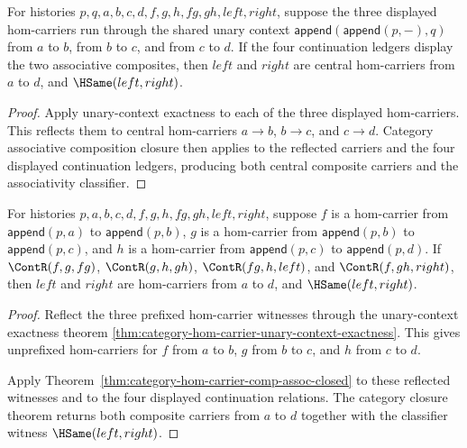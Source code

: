 \begin{theorem}
\label{thm:functor-prefix-hom-carrier-unary-suffix-comp-assoc-reflects}
For histories $p,q,a,b,c,d,f,g,h,fg,gh,left,right$, suppose the three
displayed hom-carriers run through the shared unary context
$\mathsf{append}(\mathsf{append}(p,-),q)$ from $a$ to $b$, from $b$ to $c$,
and from $c$ to $d$. If the four continuation ledgers display the two
associative composites, then $left$ and $right$ are central hom-carriers from
$a$ to $d$, and $\HSame(left,right)$.
\end{theorem}
\begin{proof}
Apply unary-context exactness to each of the three displayed hom-carriers.
This reflects them to central hom-carriers $a\to b$, $b\to c$, and $c\to d$.
Category associative composition closure then applies to the reflected
carriers and the four displayed continuation ledgers, producing both central
composite carriers and the associativity classifier.
\end{proof}

\begin{theorem}
\label{thm:functor-prefix-hom-carrier-comp-assoc-reflects}
For histories $p,a,b,c,d,f,g,h,fg,gh,left,right$, suppose $f$ is a
hom-carrier from $\mathsf{append}(p,a)$ to $\mathsf{append}(p,b)$, $g$ is a
hom-carrier from $\mathsf{append}(p,b)$ to $\mathsf{append}(p,c)$, and $h$ is
a hom-carrier from $\mathsf{append}(p,c)$ to $\mathsf{append}(p,d)$. If
$\ContR(f,g,fg)$, $\ContR(g,h,gh)$, $\ContR(fg,h,left)$, and
$\ContR(f,gh,right)$, then $left$ and $right$ are hom-carriers from $a$ to
$d$, and $\HSame(left,right)$.
\end{theorem}
\begin{proof}
Reflect the three prefixed hom-carrier witnesses through
the unary-context exactness theorem
\autoref{thm:category-hom-carrier-unary-context-exactness}. This gives unprefixed
hom-carriers for $f$ from $a$ to $b$, $g$ from $b$ to $c$, and $h$ from $c$ to
$d$.

Apply Theorem~\ref{thm:category-hom-carrier-comp-assoc-closed} to these
reflected witnesses and to the four displayed continuation relations. The category
closure theorem returns both composite carriers from $a$ to $d$ together with
the classifier witness $\HSame(left,right)$.
\end{proof}

